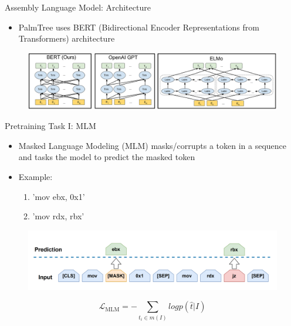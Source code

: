 \documentclass{beamer}
\begin{document}
\begin{frame}{Assembly Language Model: Architecture}
	
	\begin{itemize}
		\item PalmTree uses BERT (Bidirectional Encoder Representations from Transformers) architecture
	\end{itemize}

	\begin{figure}[h]
	\includegraphics[scale=.225]{images/BERT-GPT-ELMo.png}
	\end{figure}
	
\end{frame}

\begin{frame}{Pretraining Task I: MLM}
	
	\begin{itemize}
		\item Masked Language Modeling (MLM) masks/corrupts a token in a sequence and tasks the model to predict the masked token
		\item Example:
		\begin{enumerate}
			\item 'mov ebx, 0x1'
			\item 'mov rdx, rbx'
		\end{enumerate}
	\end{itemize}

	\begin{figure}[h]
	\includegraphics[scale=.3]{images/masked-language-modeling.png}
	\end{figure}
	
	$$\mathcal{L}_{\textrm{MLM}} = - \sum_{t_i \in m(I)} log{p(\hat{t} | I)}$$
	
\end{frame}
\end{document}
